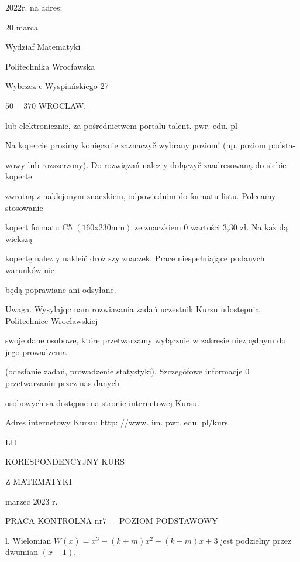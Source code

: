 \documentclass[a4paper,12pt]{article}
\begin{document}
2022r. na adres:

20 marca

Wydziaf Matematyki

Politechnika Wrocfawska

Wybrzez $\mathrm{e}$ Wyspiańskiego 27

$50-370$ WROCLAW,

lub elektronicznie, za pośrednictwem portalu talent. $\mathrm{p}\mathrm{w}\mathrm{r}$. edu. pl

Na kopercie prosimy $\underline{\mathrm{k}\mathrm{o}\mathrm{n}\mathrm{i}\mathrm{e}\mathrm{c}\mathrm{z}\mathrm{n}\mathrm{i}\mathrm{e}}$ zaznaczyč wybrany poziom! (np. poziom podsta-

wowy lub rozszerzony). Do rozwiązań nalez $\mathrm{y}$ dołączyč zaadresowaną do siebie koperte

zwrotną $\mathrm{z}$ naklejonym znaczkiem, odpowiednim do formatu listu. Polecamy stosowanie

kopert formatu C5 $(160\mathrm{x}230\mathrm{m}\mathrm{m})$ ze znaczkiem $0$ wartości 3,30 zł. Na $\mathrm{k}\mathrm{a}\dot{\mathrm{z}}$ dą wiekszą

kopertę nalez $\mathrm{y}$ nakleič $\mathrm{d}\mathrm{r}\mathrm{o}\dot{\mathrm{z}}$ szy znaczek. Prace niespełniające podanych warunków nie

będą poprawiane ani odsyłane.

Uwaga. Wysylajqc nam rozwiazania zadań uczestnik Kursu udostępnia Politechnice Wroclawskiej

swoje dane osobowe, które przetwarzamy wyłącznie $\mathrm{w}$ zakresie niezbędnym do jego prowadzenia

(odesfanie zadań, prowadzenie statystyki). Szczegófowe informacje $0$ przetwarzaniu przez nas danych

osobowych sa dostępne na stronie internetowej Kursu.

Adres internetowy Kursu: http: //www. im. pwr. edu. pl/kurs







LII

KORESPONDENCYJNY KURS

Z MATEMATYKI

marzec 2023 r.

PRACA KONTROLNA $\mathrm{n}\mathrm{r} 7-$ POZIOM PODSTAWOWY

l. Wielomian $W(x) =x^{3}-(k+m)x^{2}-(k-m)x+3$ jest podzielny przez dwumian $(x-1),$
\end{document}
